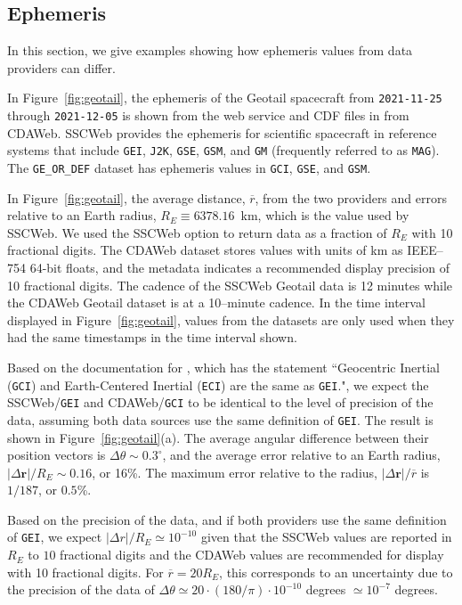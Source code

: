 \documentclass[draft]{agujournal2019}
\begin{document}
\subsection{Ephemeris}
\label{sect:comparisons_ephemeris}

In this section, we give examples showing how ephemeris values from data providers can differ.

In Figure~\ref{fig:geotail}, the ephemeris of the Geotail spacecraft from \texttt{2021-11-25} through \texttt{2021-12-05} is shown from the  web service and CDF \cite{CDF2025} files in from CDAWeb. SSCWeb provides the ephemeris for scientific spacecraft in reference systems that include \texttt{GEI}, \texttt{J2K}, \texttt{GSE}, \texttt{GSM}, and \texttt{GM} (frequently referred to as \texttt{MAG}). The \texttt{GE\_OR\_DEF} dataset has ephemeris values in \texttt{GCI}, \texttt{GSE}, and \texttt{GSM}.

In Figure~\ref{fig:geotail}, the average distance, $\overline{r}$, from the two providers and errors relative to an Earth radius, $R_E\equiv 6378.16$~km, which is the value used by SSCWeb. We used the SSCWeb option to return data as a fraction of $R_E$ with 10 fractional digits. The CDAWeb dataset stores values with units of km as IEEE--754 64-bit floats, and the metadata indicates a recommended display precision of 10 fractional digits. The cadence of the SSCWeb Geotail data is 12 minutes while the CDAWeb Geotail dataset is at a 10--minute cadence. In the time interval displayed in Figure~\ref{fig:geotail}, values from the datasets are only used when they had the same timestamps in the time interval shown.

Based on the documentation for , which has the statement ``Geocentric Inertial (\texttt{GCI}) and Earth-Centered Inertial (\texttt{ECI}) are the same as \texttt{GEI}.", we expect the SSCWeb/\texttt{GEI} and CDAWeb/\texttt{GCI} to be identical to the level of precision of the data, assuming both data sources use the same definition of \texttt{GEI}. The result is shown in Figure~\ref{fig:geotail}(a). The average angular difference between their position vectors is $\Delta \theta \sim 0.3^\circ$, and the average error relative to an Earth radius, $|\Delta\mathbf{r}|/R_E\sim 0.16$, or 16\%. The maximum error relative to the radius, $|\Delta \mathbf{r}|/\overline{r}$ is $1/187$, or $0.5$\%.

Based on the precision of the data, and if both providers use the same definition of \texttt{GEI}, we expect $|\Delta r|/R_E \simeq 10^{-10}$ given that the SSCWeb values are reported in $R_E$ to $10$ fractional digits and the CDAWeb values are recommended for display with 10 fractional digits. For $\overline{r}=20 R_E$, this corresponds to an uncertainty due to the precision of the data of $\Delta \theta \simeq 20\cdot (180/\pi) \cdot 10^{-10}$ degrees $\simeq 10^{-7}$ degrees.
\end{document}
